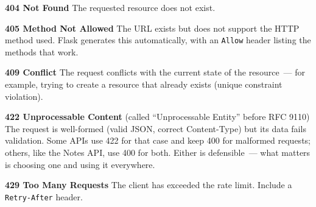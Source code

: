 \noindent{}\textbf{404 Not Found}
The requested resource does not exist.

\begin{codebox}[short]

\begin{Shaded}
\begin{Highlighting}[]
\NormalTok{: }\SpecialCharTok{\{}\SpecialCharTok{\}}\NormalTok{\}), }
\end{Highlighting}
\end{Shaded}

\end{codebox}

\noindent{}\textbf{405 Method Not Allowed}
The URL exists but does not support the HTTP method used. Flask generates this automatically, with an \texttt{Allow} header listing the methods that work.

\textbf{409 Conflict}
The request conflicts with the current state of the resource~--- for example, trying to create a resource that already exists (unique constraint violation).

\begin{codebox}[short]

\begin{Shaded}
\begin{Highlighting}[]
\NormalTok{: }\NormalTok{\}), }
\end{Highlighting}
\end{Shaded}

\end{codebox}

\noindent{}\textbf{422 Unprocessable Content} (called ``Unprocessable Entity'' before RFC 9110)
The request is well-formed (valid JSON, correct Content-Type) but its data fails validation. Some APIs use 422 for that case and keep 400 for malformed requests; others, like the Notes API, use 400 for both. Either is defensible~--- what matters is choosing one and using it everywhere.

\textbf{429 Too Many Requests}
The client has exceeded the rate limit. Include a \texttt{Retry-After} header.

\begin{codebox}[short]

\begin{Shaded}
\begin{Highlighting}[]
\NormalTok{: }\NormalTok{\}), }\NormalTok{, \{}\NormalTok{: }\NormalTok{\}}
\end{Highlighting}
\end{Shaded}

\end{codebox}

